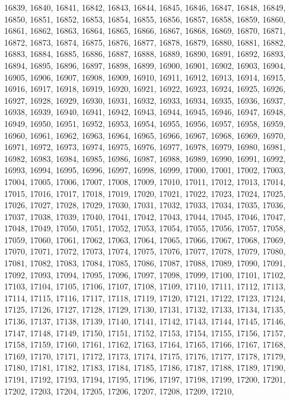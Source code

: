 16839,
16840,
16841,
16842,
16843,
16844,
16845,
16846,
16847,
16848,
16849,
16850,
16851,
16852,
16853,
16854,
16855,
16856,
16857,
16858,
16859,
16860,
16861,
16862,
16863,
16864,
16865,
16866,
16867,
16868,
16869,
16870,
16871,
16872,
16873,
16874,
16875,
16876,
16877,
16878,
16879,
16880,
16881,
16882,
16883,
16884,
16885,
16886,
16887,
16888,
16889,
16890,
16891,
16892,
16893,
16894,
16895,
16896,
16897,
16898,
16899,
16900,
16901,
16902,
16903,
16904,
16905,
16906,
16907,
16908,
16909,
16910,
16911,
16912,
16913,
16914,
16915,
16916,
16917,
16918,
16919,
16920,
16921,
16922,
16923,
16924,
16925,
16926,
16927,
16928,
16929,
16930,
16931,
16932,
16933,
16934,
16935,
16936,
16937,
16938,
16939,
16940,
16941,
16942,
16943,
16944,
16945,
16946,
16947,
16948,
16949,
16950,
16951,
16952,
16953,
16954,
16955,
16956,
16957,
16958,
16959,
16960,
16961,
16962,
16963,
16964,
16965,
16966,
16967,
16968,
16969,
16970,
16971,
16972,
16973,
16974,
16975,
16976,
16977,
16978,
16979,
16980,
16981,
16982,
16983,
16984,
16985,
16986,
16987,
16988,
16989,
16990,
16991,
16992,
16993,
16994,
16995,
16996,
16997,
16998,
16999,
17000,
17001,
17002,
17003,
17004,
17005,
17006,
17007,
17008,
17009,
17010,
17011,
17012,
17013,
17014,
17015,
17016,
17017,
17018,
17019,
17020,
17021,
17022,
17023,
17024,
17025,
17026,
17027,
17028,
17029,
17030,
17031,
17032,
17033,
17034,
17035,
17036,
17037,
17038,
17039,
17040,
17041,
17042,
17043,
17044,
17045,
17046,
17047,
17048,
17049,
17050,
17051,
17052,
17053,
17054,
17055,
17056,
17057,
17058,
17059,
17060,
17061,
17062,
17063,
17064,
17065,
17066,
17067,
17068,
17069,
17070,
17071,
17072,
17073,
17074,
17075,
17076,
17077,
17078,
17079,
17080,
17081,
17082,
17083,
17084,
17085,
17086,
17087,
17088,
17089,
17090,
17091,
17092,
17093,
17094,
17095,
17096,
17097,
17098,
17099,
17100,
17101,
17102,
17103,
17104,
17105,
17106,
17107,
17108,
17109,
17110,
17111,
17112,
17113,
17114,
17115,
17116,
17117,
17118,
17119,
17120,
17121,
17122,
17123,
17124,
17125,
17126,
17127,
17128,
17129,
17130,
17131,
17132,
17133,
17134,
17135,
17136,
17137,
17138,
17139,
17140,
17141,
17142,
17143,
17144,
17145,
17146,
17147,
17148,
17149,
17150,
17151,
17152,
17153,
17154,
17155,
17156,
17157,
17158,
17159,
17160,
17161,
17162,
17163,
17164,
17165,
17166,
17167,
17168,
17169,
17170,
17171,
17172,
17173,
17174,
17175,
17176,
17177,
17178,
17179,
17180,
17181,
17182,
17183,
17184,
17185,
17186,
17187,
17188,
17189,
17190,
17191,
17192,
17193,
17194,
17195,
17196,
17197,
17198,
17199,
17200,
17201,
17202,
17203,
17204,
17205,
17206,
17207,
17208,
17209,
17210,
